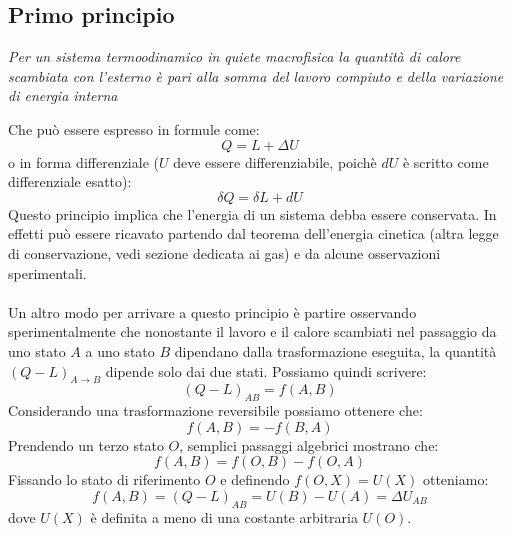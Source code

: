 \documentclass{article}
\begin{document}
\subsection{Primo principio}
\begin{center}
    \textit{Per un sistema termoodinamico in quiete macrofisica la quantità di calore scambiata con l'esterno è pari alla somma del lavoro compiuto e della variazione di energia interna}
\end{center}
Che può essere espresso in formule come:
$$ Q=L+\Delta U $$
o in forma differenziale ($U$ deve essere differenziabile, poichè $dU$ è scritto come differenziale esatto):
$$ \delta Q=\delta L + dU $$
Questo principio implica che l'energia di un sistema debba essere conservata. In effetti può essere ricavato partendo dal teorema dell'energia cinetica (altra legge di conservazione, vedi sezione dedicata ai gas) e da alcune osservazioni sperimentali.\\\\
Un altro modo per arrivare a questo principio è partire osservando sperimentalmente che nonostante il lavoro e il calore scambiati nel passaggio da uno stato $A$ a uno stato $B$ dipendano dalla trasformazione eseguita, la quantità $(Q-L)_{A\rightarrow B}$ dipende solo dai due stati. Possiamo quindi scrivere:
$$ (Q-L)_{AB} = f(A, B) $$
Considerando una trasformazione reversibile possiamo ottenere che:
$$ f(A,B)=-f(B,A) $$
Prendendo un terzo stato $O$, semplici passaggi algebrici mostrano che:
$$ f(A,B)=f(O,B)-f(O, A) $$
Fissando lo stato di riferimento $O$ e definendo $f(O,X)=U(X)$ otteniamo:
$$ f(A,B)=(Q-L)_{AB}=U(B)-U(A)=\Delta U_{AB} $$
dove $U(X)$ è definita a meno di una costante arbitraria $U(O)$.
\end{document}
